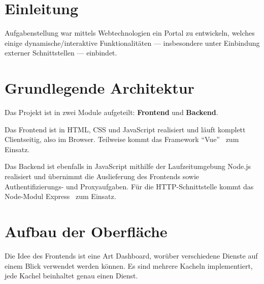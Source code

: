 \documentclass[fleqn,10pt]{SelfArx} %
\affiliation{\textsuperscript{1}\textit{Studiengang Informationstechnik, Fakultät Technik, Duale Hochschule Baden-Württemberg, Stuttgart}} %
\begin{document}
\flushbottom %

\maketitle %

\tableofcontents %

\thispagestyle{empty} %


\section*{Einleitung} %

Aufgabenstellung war mittels Webtechnologien ein Portal zu entwickeln, welches einige dynamische/interaktive Funktionalitäten --- insbesondere unter Einbindung externer Schnittstellen --- einbindet.

\section{Grundlegende Architektur}
Das Projekt ist in zwei Module aufgeteilt: \textbf{Frontend} und \textbf{Backend}.

Das Frontend ist in HTML, CSS und JavaScript realisiert und läuft komplett Clientseitig, also im Browser. Teilweise kommt das Framework \enquote{Vue}~\cite{vue} zum Einsatz.

Das Backend ist ebenfalls in JavaScript mithilfe der Laufzeitumgebung Node.js~\cite{nodejs} realisiert und übernimmt die Auslieferung des Frontends sowie Authentifizierungs- und Proxyaufgaben. Für die HTTP-Schnittstelle kommt das Node-Modul Express~\cite{express} zum Einsatz.
\section{Aufbau der Oberfläche}
Die Idee des Frontends ist eine Art Dashboard, worüber verschiedene Dienste auf einem Blick verwendet werden können. Es sind mehrere Kacheln implementiert, jede Kachel beinhaltet genau einen Dienst.
\end{document}
